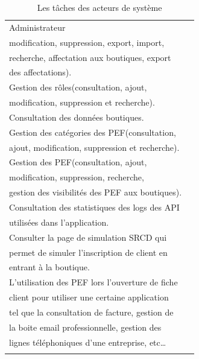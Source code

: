 \begin{longtable}[c]{|l|l|}
	Administrateur               & \begin{tabular}[c]{@{}l@{}}\tabitem Gestion des utilisateurs(consultation, ajout,\\ modification, suppression, export, import,\\ recherche, affectation aux boutiques, export\\ des affectations).\\ \tabitem Gestion des rôles(consultation, ajout,\\ modification, suppression et recherche).\\ \tabitem Consultation des données boutiques.\\ Gestion des catégories des PEF(consultation,\\ ajout, modification, suppression et recherche).\\ \tabitem Gestion des PEF(consultation, ajout,\\ modification, suppression, recherche,\\ gestion des visibilités des PEF aux boutiques).\\ \tabitem Consultation des statistiques des logs des API\\ utilisées dans l’application.\\ \tabitem Consulter la page de simulation SRCD qui\\ permet de simuler l’inscription de client en\\ entrant à la boutique.\\ \tabitem L’utilisation des PEF lors l’ouverture de fiche\\ client pour utiliser une certaine application\\ tel que la consultation de facture, gestion de\\ la boite email professionnelle, gestion des\\ lignes téléphoniques d’une entreprise, etc…\end{tabular} \\ \hline
	\captionsetup{justification=centering}
	\caption{Les tâches des acteurs de système}
	\label{tab:my-table}\\
\end{longtable}

